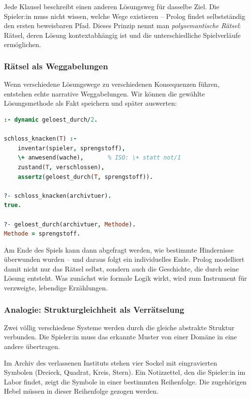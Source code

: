 \documentclass[parskip=half,a4paper,11pt]{scrreprt}
\begin{document}
Jede Klausel beschreibt einen anderen Lösungsweg für dasselbe Ziel. Die Spieler:in muss nicht wissen, welche Wege existieren – Prolog findet selbstständig den ersten beweisbaren Pfad. Dieses Prinzip nennt man \emph{polysemantische Rätsel}: Rätsel, deren Lösung kontextabhängig ist und die unterschiedliche Spielverläufe ermöglichen.

\subsubsection{Rätsel als Weggabelungen}

Wenn verschiedene Lösungswege zu verschiedenen Konsequenzen führen, entstehen echte narrative Weggabelungen. Wir können die gewählte Lösungsmethode als Fakt speichern und später auswerten:

\begin{lstlisting}[language=Prolog, caption={}]
:- dynamic geloest_durch/2.

schloss_knacken(T) :-
    inventar(spieler, sprengstoff),
    \+ anwesend(wache),       % ISO: \+ statt not/1
    zustand(T, verschlossen),
    assertz(geloest_durch(T, sprengstoff)).

?- schloss_knacken(archivtuer).
true.

?- geloest_durch(archivtuer, Methode).
Methode = sprengstoff.
\end{lstlisting}

Am Ende des Spiels kann dann abgefragt werden, wie bestimmte Hindernisse überwunden wurden – und daraus folgt ein individuelles Ende. Prolog modelliert damit nicht nur das Rätsel selbst, sondern auch die Geschichte, die durch seine Lösung entsteht. Was zunächst wie formale Logik wirkt, wird zum Instrument für verzweigte, lebendige Erzählungen.

\subsubsection{Analogie: Strukturgleichheit als Verrätselung}

Zwei völlig verschiedene Systeme werden durch die gleiche abstrakte Struktur verbunden. Die Spieler:in muss das erkannte Muster von einer Domäne in eine andere übertragen.

Im Archiv des verlassenen Instituts stehen vier Sockel mit eingravierten Symbolen (Dreieck, Quadrat, Kreis, Stern). Ein Notizzettel, den die Spieler:in im Labor findet, zeigt die Symbole in einer bestimmten Reihenfolge. Die zugehörigen Hebel müssen in dieser Reihenfolge gezogen werden.
\end{document}

